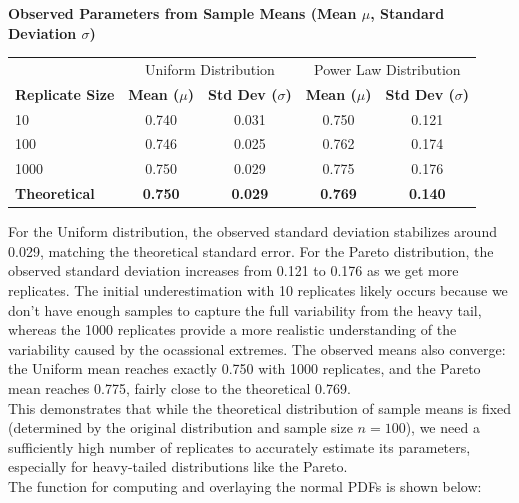 \begin{center}
    \textbf{Observed Parameters from Sample Means (Mean $\mu$, Standard Deviation $\sigma$)}
    \vspace{0.5em}

    \begin{tabular}{lcc|cc}
    \toprule
    & \multicolumn{2}{c|}{Uniform Distribution} & \multicolumn{2}{c}{Power Law Distribution} \\
    \textbf{Replicate Size} & \textbf{Mean ($\mu$)} & \textbf{Std Dev ($\sigma$)} & \textbf{Mean ($\mu$)} & \textbf{Std Dev ($\sigma$)} \\
    \midrule
    10 & 0.740 & 0.031 & 0.750 & 0.121 \\
    100 & 0.746 & 0.025 & 0.762 & 0.174 \\
    1000 & 0.750 & 0.029 & 0.775 & 0.176 \\
    \midrule
    \textbf{Theoretical} & \textbf{0.750} & \textbf{0.029} & \textbf{0.769} & \textbf{0.140} \\
    \bottomrule
    \end{tabular}
\end{center}

For the Uniform distribution, the observed standard deviation stabilizes around 0.029, matching the theoretical standard error. For the Pareto distribution, the observed standard deviation increases from 0.121 to 0.176 as we get more replicates. The initial underestimation with 10 replicates likely occurs because we don't have enough samples to capture the full variability from the heavy tail, whereas the 1000 replicates provide a more realistic understanding of the variability caused by the ocassional extremes. The observed means also converge: the Uniform mean reaches exactly 0.750 with 1000 replicates, and the Pareto mean reaches 0.775, fairly close to the theoretical 0.769.\\

This demonstrates that while the theoretical distribution of sample means is fixed (determined by the original distribution and sample size $n=100$), we need a sufficiently high number of replicates to accurately estimate its parameters, especially for heavy-tailed distributions like the Pareto.\\

The function for computing and overlaying the normal PDFs is shown below:

